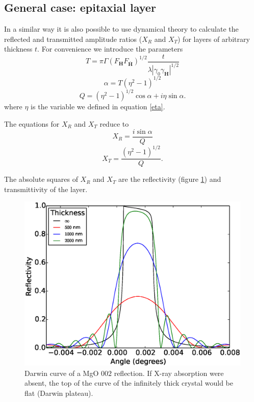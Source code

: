 \documentclass[12pt,oneside,notitlepage,abstracton,a4paper]{scrartcl}
\begin{document}
\subsection{General case: epitaxial layer}
In a similar way it is also possible to use dynamical theory to calculate the reflected and transmitted amplitude ratios ($X_R$ and $X_T$) for layers of arbitrary thickness $t$. For convenience we introduce the parameters
\begin{equation}
 T=\pi \Gamma (F_\mathbf{H}F_\mathbf{\bar{H}})^{1/2}\frac{t}{\lambda |\gamma_0 \gamma_\mathbf{H}|^{1/2}}
 \end{equation}
\begin{equation}
 \alpha=T(\eta^2-1)^{1/2}
 \end{equation}
\begin{equation}
 Q=(\eta^2-1)^{1/2}\cos{\alpha} +i\eta \sin{\alpha}.
\end{equation}
where $\eta$ is the variable we defined in equation \ref{eta}.

The equations for $X_R$ and $X_T$ reduce to
\begin{equation}\label{XR}
 X_R=\frac{i \sin{\alpha}}{Q}
 \end{equation}
\begin{equation}\label{XT}
 X_T=\frac{(\eta^2-1)^{1/2}}{Q}.
\end{equation}

The absolute squares of $X_R$ and $X_T$ are the reflectivity (figure \ref{dyn}) and transmittivity of the layer.

\begin{figure}[h]
\begin{center}
\includegraphics[width=12 cm]{pics/dynamical.eps}
\caption{Darwin curve of a MgO $002$ reflection. If X-ray absorption were absent, the top of the curve of the infinitely thick crystal would be flat (Darwin plateau).}
\label{dyn}
\end{center}
\end{figure}
\end{document}
